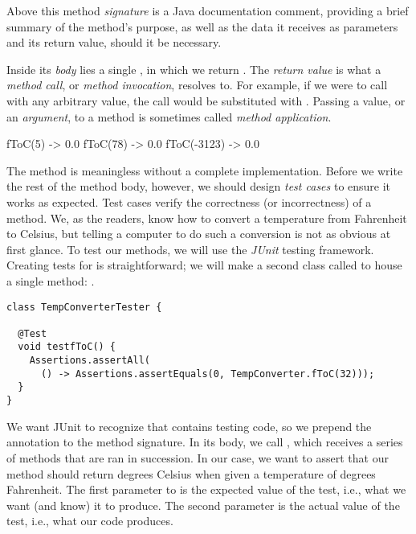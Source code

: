 Above this method \emph{signature} is a Java documentation comment, providing a brief summary of the method's purpose, as well as the data it receives as parameters and its return value, should it be necessary. 

Inside its \emph{body} lies a single , in which we return . 
The \emph{return value} is what a \emph{method call}, or \emph{method invocation}, resolves to. 
For example, if we were to call  with any arbitrary  value, the call would be substituted with . 
Passing a value, or an \emph{argument}, to a method is sometimes called \emph{method application}.

\begin{verbnobox}[\small]
fToC(5)     -> 0.0
fToC(78)    -> 0.0
fToC(-3123) -> 0.0
\end{verbnobox}

The  method is meaningless without a complete implementation. 
Before we write the rest of the method body, however, we should design \emph{test cases} to ensure it works as expected. 
Test cases verify the correctness (or incorrectness) of a method. 
We, as the readers, know how to convert a temperature from Fahrenheit to Celsius, but telling a computer to do such a conversion is not as obvious at first glance. 
To test our methods, we will use the \emph{JUnit} testing framework. Creating tests for  is straightforward; we will make a second class called  to house a single method: .

\begin{lstlisting}[language=MyJava]
class TempConverterTester {

  @Test
  void testfToC() {
    Assertions.assertAll(
      () -> Assertions.assertEquals(0, TempConverter.fToC(32)));
  }
}
\end{lstlisting}

We want JUnit to recognize that  contains testing code, so we prepend the  annotation to the method signature. 
In its body, we call , which receives a series of methods that are ran in succession. 
In our case, we want to assert that our  method should return  degrees Celsius when given a temperature of  degrees Fahrenheit. 
The first parameter to  is the expected value of the test, i.e., what we want (and know) it to produce. 
The second parameter is the actual value of the test, i.e., what our code produces. 

